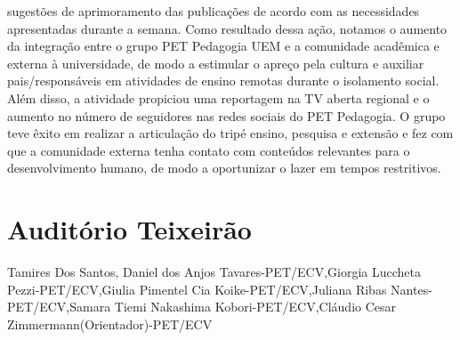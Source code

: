 sugestões de aprimoramento das publicações de acordo com as necessidades apresentadas durante 
a semana. Como resultado dessa ação, notamos o aumento da integração entre o grupo PET 
Pedagogia UEM e a comunidade acadêmica e externa à universidade, de modo a estimular o apreço 
pela cultura e auxiliar pais/responsáveis em atividades de ensino remotas durante o isolamento 
social. Além disso, a atividade propiciou uma reportagem na TV aberta regional e o aumento no 
número de seguidores nas redes sociais do PET Pedagogia. O grupo teve êxito em realizar a 
articulação do tripé ensino, pesquisa e extensão e fez com que a comunidade externa tenha contato 
com conteúdos relevantes para o desenvolvimento humano, de modo a oportunizar o lazer em 
tempos restritivos.




\section*{Auditório Teixeirão}

Tamires Dos Santos, Daniel dos Anjos Tavares-PET/ECV,Giorgia Luccheta Pezzi-PET/ECV,Giulia Pimentel Cia Koike-PET/ECV,Juliana Ribas Nantes-PET/ECV,Samara Tiemi Nakashima Kobori-PET/ECV,Cláudio Cesar Zimmermann(Orientador)-PET/ECV

